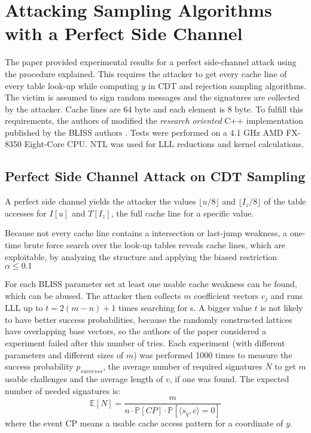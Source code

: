 \newpage
\section{Attacking Sampling Algorithms with a Perfect Side Channel}
The paper \cite{cryptoeprint:2016:300} provided experimental results for a perfect side-channel attack using the procedure explained. This requires the attacker to get every cache line of every table look-up while computing $y$ in CDT and rejection sampling algorithms. The victim is assumed to sign random messages and the signatures are collected by the attacker. Cache lines are 64 byte and each element is 8 byte. 
To fulfill this requirements, the authors of \cite{cryptoeprint:2016:300} modified the \textit{research oriented} C++ implementation published by the BLISS authors \cite{blisshp}. Tests were performed on a 4.1 GHz AMD FX-8350 Eight-Core CPU. NTL was used for LLL reductions and kernel calculations.
\subsection{Perfect Side Channel Attack on CDT Sampling}
A perfect side channel yields the attacker the values $\lfloor u/8 \rfloor$ and $\lfloor I_z/8 \rfloor$ of the table accesses for $I[u]$ and $T[I_z]$, the full cache line for a specific value. 

Because not every cache line contains a intersection or last-jump weakness, a one-time brute force search over the look-up tables reveals cache lines, which are exploitable, by analyzing the structure and applying the biased restriction $\alpha \le 0.1$

For each BLISS parameter set at least one usable cache weakness can be found, which can be abused. 
The attacker then collects $m$ coefficient vectors $c_j$ and runs LLL up to $t = 2(m-n)+1$ times searching for s. A bigger value $t$ is not likely to have better success probabilities, because the randomly constructed lattices have overlapping base vectors, so the authors of the paper considered a experiment failed after this number of tries. Each experiment (with different parameters and different sizes of $m$) was performed 1000 times to measure the success probability $p_{successs}$, the average number of required signatures $\bar{N}$ to get $m$ usable challenges and the average length of $v$, if one was found.
The expected number of needed signatures is:
\begin{equation*}
\mathbb{E}[N] = \frac{m}{n \cdot \mathbb{P}[CP] \cdot \mathbb{P}[\langle s_q, c \rangle = 0]}
\end{equation*}
where the event CP means a usable cache access pattern for a coordinate of $y$.


